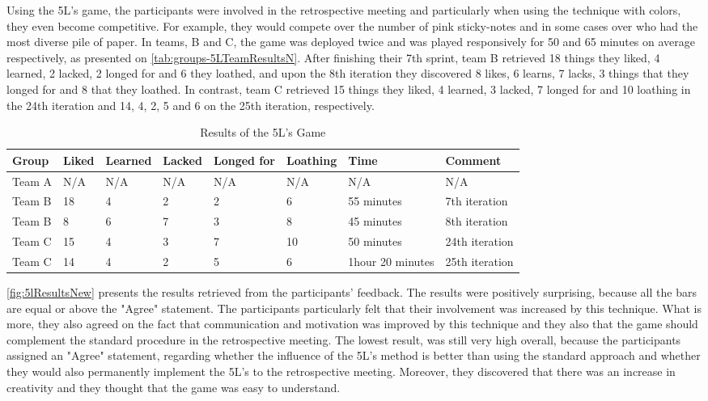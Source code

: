 Using the 5L’s game, the participants were involved in the retrospective meeting and particularly when using the technique with colors, they even become competitive. For example, they would compete over the number of pink sticky-notes and in some cases over who had the most diverse pile of paper. In teams, B and C, the game was deployed twice and was played responsively for 50 and 65 minutes on average respectively, as presented on \autoref{tab:groups-5LTeamResultsN}. After finishing their 7th sprint, team B retrieved 18 things they liked, 4 learned, 2 lacked, 2 longed for and 6 they loathed, and upon the 8th iteration they discovered 8 likes, 6 learns, 7 lacks, 3 things that they longed for and 8 that they loathed. In contrast, team C retrieved 15 things they liked, 4 learned, 3 lacked, 7 longed for and 10 loathing in the 24th iteration and 14, 4, 2, 5 and 6 on the 25th iteration, respectively. 

\begin{table}[!htbp]
	\caption{Results of the 5L's Game}
	\label{tab:groups-5LTeamResultsN}
	\begin{tabularx}{\textwidth}{|X|X|X|X|X|X|X|X|}
	\hline
		Group & Liked & Learned & Lacked & Longed for & Loathing & Time & Comment\\ \hline
		Team A &  N/A & N/A & N/A &  N/A & N/A & N/A & N/A \\ \hline
		Team B & 18 & 4 & 2 & 2 & 6 & 55 minutes & 7th iteration\\ \hline
        Team B & 8 & 6 & 7 & 3 & 8 & 45 minutes & 8th iteration\\ \hline
        Team C & 15 & 4 & 3 & 7 & 10 & 50 minutes & 24th iteration\\ \hline
        Team C & 14 & 4 & 2 & 5 & 6 & 1hour 20 minutes & 25th iteration\\ \hline
	\end{tabularx}
\end{table}

\autoref{fig:5lResultsNew} presents the results retrieved from the participants' feedback. The results were positively surprising, because all the bars are equal or above the "Agree" statement. The participants  particularly felt that their involvement was increased by this technique. What is more, they also agreed on the fact that communication and motivation was improved by this technique and they also that the game should complement the standard procedure in the retrospective meeting. The lowest result, was still very high overall, because the participants assigned an "Agree" statement, regarding whether the influence of the 5L’s method is better than using the standard approach and whether they would also permanently implement the 5L’s to the retrospective meeting. Moreover, they discovered that there was an increase in creativity and they thought that the game was easy to understand.


